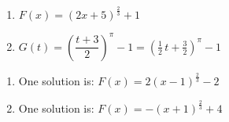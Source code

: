 \documentclass{ximera}
\begin{document}
\begin{multicols}{2}
\begin{enumerate}
\setcounter{enumi}{\value{HW}}
\item  $F(x) =(2x+5)^{\frac{2}{3}}+1$   \\





\columnbreak


\item  $G(t) = \left( \dfrac{t+3}{2}\right)^{\pi}-1= \left( \frac{1}{2} \, t + \frac{3}{2}\right)^{\pi} -1$\\




\setcounter{HW}{\value{enumi}}
\end{enumerate}
\end{multicols}

\begin{multicols}{2}

\begin{enumerate}
\setcounter{enumi}{\value{HW}}

\item One solution is: $F(x) = 2(x-1)^{\frac{2}{3}}-2$

\item  One solution is: $F(x) =-(x+1)^{\frac{2}{3}} + 4$


\setcounter{HW}{\value{enumi}}
\end{enumerate}

\end{multicols}

\newpage
\end{document}
